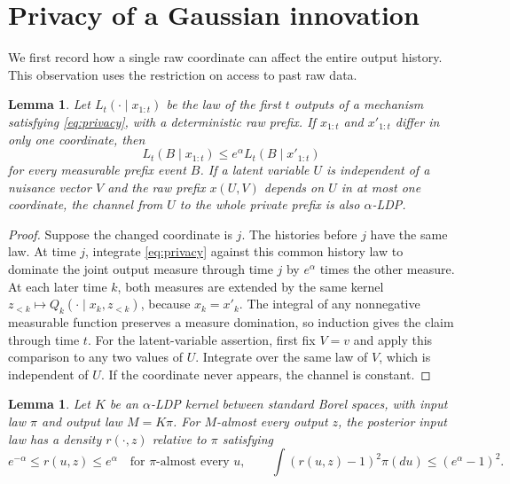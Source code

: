 \documentclass[11pt]{article}
\newtheorem{lemma}[theorem]{Lemma}
\theoremstyle{remark}
\begin{document}
\section{Privacy of a Gaussian innovation}\label{sec:innovation}

We first record how a single raw coordinate can affect the entire output
history. This observation uses the restriction on access to past raw data.

\begin{lemma}\label{lem:prefix}
Let $L_t(\cdot\mid x_{1:t})$ be the law of the first $t$ outputs of a
mechanism satisfying \eqref{eq:privacy}, with a deterministic raw prefix.
If $x_{1:t}$ and $x'_{1:t}$ differ in only one coordinate, then
\[
 L_t(B\mid x_{1:t})\le e^\alpha L_t(B\mid x'_{1:t})
\]
for every measurable prefix event $B$.
If a latent variable $U$ is independent of a nuisance vector $V$ and the
raw prefix $x(U,V)$ depends on $U$ in at most one coordinate, the channel
from $U$ to the whole private prefix is also $\alpha$-LDP.
\end{lemma}

\begin{proof}
Suppose the changed coordinate is $j$. The histories before $j$ have the
same law. At time $j$, integrate \eqref{eq:privacy} against this common
history law to dominate the joint output measure through time $j$ by
$e^\alpha$ times the other measure. At each later time $k$, both measures
are extended by the same kernel
$z_{<k}\mapsto Q_k(\cdot\mid x_k,z_{<k})$, because $x_k=x'_k$.
The integral of any nonnegative measurable function preserves a measure
domination, so induction gives the claim through time $t$.
For the latent-variable assertion, first fix $V=v$ and apply this comparison
to any two values of $U$. Integrate over the same law of $V$, which is
independent of $U$. If the coordinate never appears, the channel is constant.
\end{proof}

\begin{lemma}\label{lem:posterior}
Let $K$ be an $\alpha$-LDP kernel between standard Borel spaces, with input
law $\pi$ and output law $M=K\pi$. For $M$-almost every output $z$, the
posterior input law has a density $r(\cdot,z)$ relative to $\pi$ satisfying
\begin{equation}\label{eq:posterior}
 e^{-\alpha}\le r(u,z)\le e^\alpha\quad\text{for $\pi$-almost every $u$},
 \qquad \int(r(u,z)-1)^2\pi(du)\le(e^\alpha-1)^2.
\end{equation}
\end{lemma}
\end{document}
